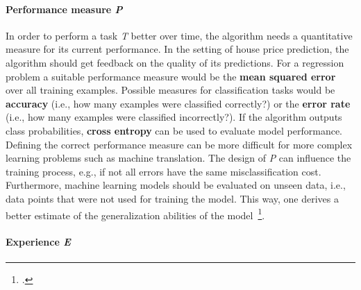 \paragraph{Performance measure \textit{P}}

In order to perform a task \textit{T} better over time, the algorithm needs
a quantitative measure for its current performance. In the setting of
house price prediction, the algorithm should get feedback on the quality of its
predictions. For a regression problem a suitable performance measure would be 
the \textbf{mean squared error} over all training examples. Possible measures
for classification tasks would be \textbf{accuracy} (i.e., how many examples
were classified correctly?) or the \textbf{error rate} (i.e., how many
examples were classified incorrectly?). If the algorithm outputs class 
probabilities, \textbf{cross entropy} can be used to evaluate model
performance. Defining the correct performance measure can be more difficult
for more complex learning problems such as machine translation. The design of 
\textit{P} can influence the training process, e.g., if not all errors have the
same misclassification cost. Furthermore, machine learning models should be evaluated on unseen
data, i.e., data points that were not used for training the model. This way,
one derives a better estimate of the generalization abilities of the model~\footcite{Bishop2006, Goodfellow2016, Mitchell1997}.

\paragraph{Experience \textit{E}}

